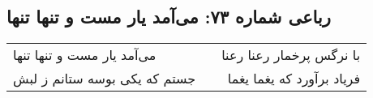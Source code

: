 \begin{center}
\section*{رباعی شماره ۷۳: می‌آمد یار مست و تنها تنها}
\label{sec:0073}
\begin{longtable}{l p{0.5cm} r}
می‌آمد یار مست و تنها تنها
&&
با نرگس پرخمار رعنا رعنا
\\
جستم که یکی بوسه ستانم ز لبش
&&
فریاد برآورد که یغما یغما
\\
\end{longtable}
\end{center}
